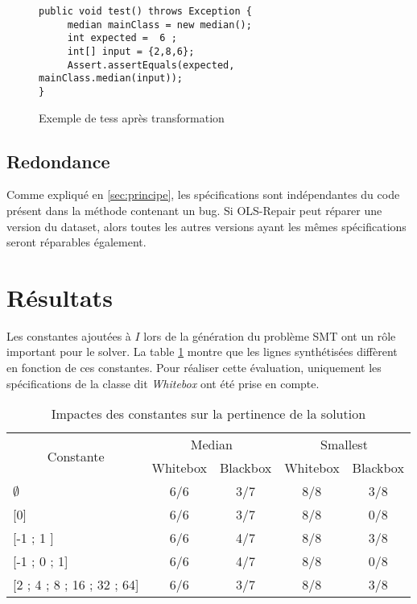 \begin{figure}
\begin{lstlisting}
public void test() throws Exception {
     median mainClass = new median();
     int expected =  6 ;
     int[] input = {2,8,6};
     Assert.assertEquals(expected, mainClass.median(input));
}
\end{lstlisting}
\label{fig:dataset_apres_transfo}
\caption{Exemple de tess après transformation}
\end{figure}

\subsection{Redondance}

Comme expliqué en \ref{sec:principe}, les spécifications sont indépendantes du code présent dans la méthode contenant un bug. Si OLS-Repair peut réparer une version du dataset, alors toutes les autres versions ayant les mêmes spécifications seront réparables également.

\section{Résultats}

Les constantes ajoutées à $I$ lors de la génération du problème SMT ont un rôle important pour le solver. La table \ref{table:constantes} montre que les lignes synthétisées diffèrent en fonction de ces constantes. Pour réaliser cette évaluation, uniquement les spécifications de la classe dit \textit{Whitebox} ont été prise en compte.  

\begin{table}[H]
\centering
\begin{tabular}{|l|c|c|c|c|}
\hline
\multicolumn{1}{|c|}{\multirow{2}{*}{Constante}} & \multicolumn{2}{c|}{Median} & \multicolumn{2}{c|}{Smallest} \\ \cline{2-5} 
\multicolumn{1}{|c|}{}                           & Whitebox     & Blackbox     & Whitebox      & Blackbox      \\ \hline
$\emptyset$                                           & 6/6          & 3/7          & 8/8           & 3/8           \\ \hline
{[}0{]}                                          & 6/6          & 3/7          & 8/8           & 0/8           \\ \hline
{[}-1 ; 1 {]}                                    & 6/6          & 4/7          & 8/8           & 3/8           \\ \hline
{[}-1 ; 0 ; 1{]}                                 & 6/6          & 4/7          & 8/8           & 0/8           \\ \hline
{[}2 ; 4 ; 8 ; 16 ; 32 ; 64{]}                   & 6/6          & 3/7          & 8/8           & 3/8           \\ \hline
\end{tabular}
\caption{Impactes des constantes sur la pertinence de la solution}
\label{table:constantes}
\end{table}

